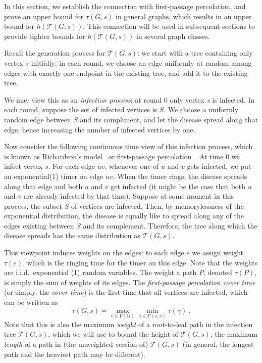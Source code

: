 \documentclass{patmorin}
\newcommand{\tcal}{\mathcal{T}}
\begin{document}
In this section, we establish the connection with first-passage percolation, and prove an upper bound for $\tau(G,s)$ in general graphs, which results in an upper bound for $h(\tcal(G,s))$.
This connection will be used in subsequent sections to provide tighter bounds for $h(\tcal(G,s))$ in several graph classes.



Recall the generation process for $\tcal(G,s)$:
we start with a tree containing only vertex $s$ initially;
in each round, we choose an edge uniformly at random
among edges with exactly one endpoint in the existing tree,
and add it to the existing tree.


We may view this as an \emph{infection process}:
at round 0 only vertex $s$ is infected.
In each round, suppose the set of infected vertices is $S$.
We choose a uniformly random edge between $S$ and its compliment, and let the disease spread along that edge, hence increasing the number of infected vertices by one.

Now consider the following 
continuous time view of this infection process, which is  known as Richardson's model~\cite{richardson_survey} or first-passage percolation~\cite{fpp_survey}.
At time $0$ we infect vertex $s$.
For each edge $uv$, whenever one of $u$ and $v$ gets infected,
we put an exponential(1) timer on edge $uv$.
When the timer rings, the disease spreads along that edge and both $u$ and $v$ get infected (it might be the case that both $u$ and $v$ are already infected by that time).
Suppose at some moment in this process, the subset $S$ of vertices are infected. Then, by memorylessness of the exponential distribution, the disease is equally like to spread along any of the edges existing between $S$ and its complement.
Therefore, the tree along which the disease spreads has the same distribution as $\tcal(G,s)$.

This viewpoint induces weights on the edges:
to each edge $e$ we  assign weight $\tau(e)$, which is the ringing time for the timer on this edge.
Note that the weights are i.i.d.\ exponential (1) random variables.
The weight a path $P$, denoted $\tau(P)$, is simply the sum of weights of its edges.
The \emph{first-passage percolation cover time} (or simply, the \emph{cover time}) is the first time that all vertices are infected, which can be written as
\[
	\tau(G,s) = \max_{v\in V(G)} \min_{\gamma\in\Gamma(s,v)} \tau(\gamma) \:.
\]
Note that this is also the maximum \emph{weight} of a root-to-leaf path in the infection tree $\tcal(G,s)$, 
which we will use to bound the {height} of $\tcal(G,s)$,
the maximum \emph{length} of a path in (the unweighted version of) $\tcal(G,s)$ (in general, the longest path and the heaviest path may be different).
\end{document}
